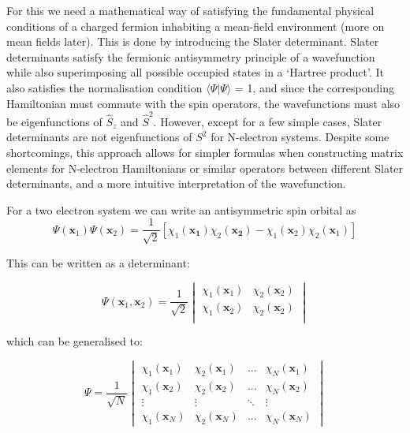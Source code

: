 \documentclass[10pt]{article}
\begin{document}


For this we need a mathematical way of satisfying the fundamental physical conditions of a charged fermion inhabiting a mean-field environment (more on mean fields later). This is done by introducing the Slater determinant. Slater determinants satisfy the fermionic antisymmetry principle of a wavefunction while also superimposing all possible occupied states in a `Hartree product'. It also satisfies the normalisation condition $\langle \Psi | \Psi \rangle$ = 1, and since the corresponding Hamiltonian must commute with the spin operators, the wavefunctions must also be eigenfunctions of $\hat{S}_z$ and $\hat{S}^2$. However, except for a few simple cases, Slater determinants are not eigenfunctions of $S^2$ for N-electron systems. Despite some shortcomings, this approach allows for simpler formulas when constructing matrix elements for N-electron Hamiltonians or similar operators between different Slater determinants, and a more intuitive interpretation of the wavefunction.

For a two electron system we can write an antisymmetric spin orbital as $$\Psi(\mathbf{x}_1)\Psi(\mathbf{x}_2) = \frac{1}{\sqrt{2}}[\chi_1(\mathbf{x_1})\chi_2(\mathbf{x_2})-\chi_1(\mathbf{x}_2)\chi_2(\mathbf{x}_1)]$$

This can be written as a determinant:

\begin{equation*}
	\Psi(\mathbf{x}_1,\mathbf{x}_2) = \frac{1}{\sqrt{2}}
\begin{vmatrix}
	\chi_1(\mathbf{x}_1) & \chi_2(\mathbf{x}_2)\\
	\chi_1(\mathbf{x}_2) & \chi_2(\mathbf{x}_2) \\
	\end{vmatrix}
\end{equation*}

which can be generalised to:

\begin{equation}
	\Psi = \frac{1}{\sqrt{N}}
	\begin{vmatrix}
	\chi_1(\mathbf{x}_1) & \chi_2(\mathbf{x}_1) & ... & \chi_N(\mathbf{x}_1) \\
	\chi_1(\mathbf{x}_2) & \chi_2(\mathbf{x}_2) & ... & \chi_N(\mathbf{x}_2) \\
	\vdots & \vdots &\ddots & \vdots \\
	\chi_1(\mathbf{x}_N) & \chi_2(\mathbf{x}_N) & ... & \chi_N(\mathbf{x}_N)
	\end{vmatrix}
\end{equation}
\end{document}
